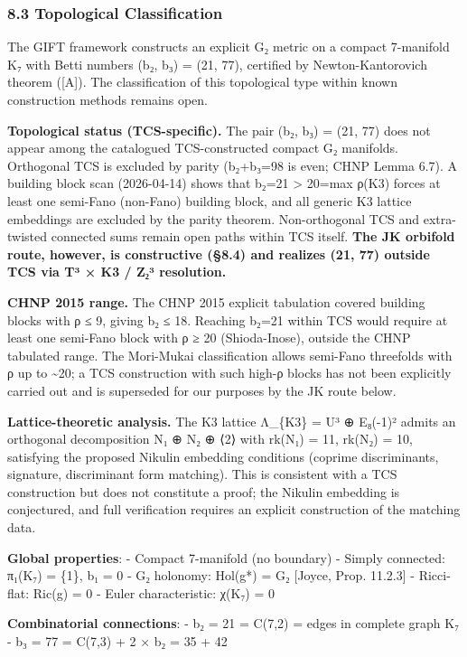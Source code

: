 \documentclass[11pt,a4paper]{article}
\begin{document}
{{{{{{{{{{{{{{{\subsubsection{8.3 Topological Classification}\label{topological-classification}

The GIFT framework constructs an explicit G₂ metric on a compact 7-manifold K₇ with Betti numbers
(b₂, b₃) = (21, 77), certified by Newton-Kantorovich theorem ([A]). The classification of this topological type within known construction methods remains open.

\textbf{Topological status (TCS-specific).} The pair (b₂, b₃) = (21, 77) does not appear among the catalogued TCS-constructed compact G₂ manifolds. Orthogonal TCS is excluded by parity (b₂+b₃=98 is even; CHNP Lemma 6.7). A building block scan (2026-04-14) shows that b₂=21 \textgreater{} 20=max ρ(K3) forces at least one semi-Fano (non-Fano) building block, and all generic K3 lattice embeddings are excluded by the parity theorem. Non-orthogonal TCS and extra-twisted connected sums remain open paths within TCS itself. \textbf{The JK orbifold route, however, is constructive (§8.4) and realizes (21, 77) outside TCS via T³ × K3 / Z₂³ resolution.}

\textbf{CHNP 2015 range.} The CHNP 2015 explicit tabulation covered building blocks with ρ ≤ 9, giving b₂ ≤ 18. Reaching b₂=21 within TCS would require at least one semi-Fano block with ρ ≥ 20 (Shioda-Inose), outside the CHNP tabulated range. The Mori-Mukai classification allows semi-Fano threefolds with ρ up to \textasciitilde20; a TCS construction with such high-ρ blocks has not been explicitly carried out and is superseded for our purposes by the JK route below.

\textbf{Lattice-theoretic analysis.} The K3 lattice Λ\_\{K3\} = U³ ⊕ E₈(-1)² admits an
orthogonal decomposition N₁ ⊕ N₂ ⊕ ⟨2⟩ with rk(N₁) = 11, rk(N₂) = 10, satisfying
the proposed Nikulin embedding conditions (coprime discriminants, signature, discriminant form
matching). This is consistent with a TCS construction but does not constitute a proof; the Nikulin embedding is conjectured, and full verification requires an explicit construction of the matching data.

\textbf{Global properties}:
- Compact 7-manifold (no boundary)
- Simply connected: π₁(K₇) = \{1\}, b₁ = 0
- G₂ holonomy: Hol(g*) = G₂ {[}Joyce, Prop. 11.2.3{]}
- Ricci-flat: Ric(g) = 0
- Euler characteristic: χ(K₇) = 0

\textbf{Combinatorial connections}:
- b₂ = 21 = C(7,2) = edges in complete graph K₇
- b₃ = 77 = C(7,3) + 2 × b₂ = 35 + 42

}}}}}}}}}}}}}}}
\end{document}
